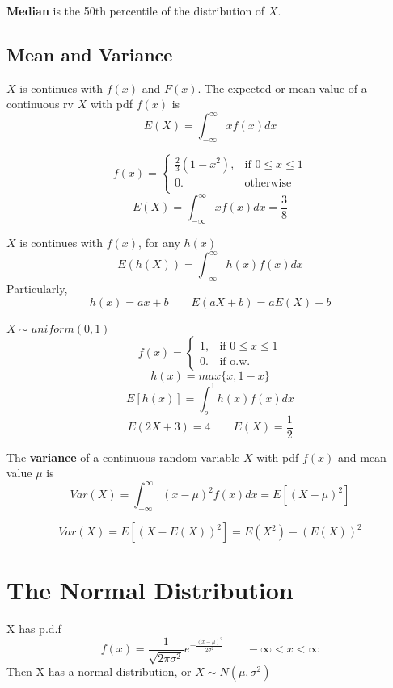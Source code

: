 \textbf{Median} is the 50th percentile of the distribution of $X$.
\subsection{Mean and Variance}
\begin{defn}
$X$ is continues with $f(x)$ and $F(x)$. The expected or mean value of a continuous rv $X$ with pdf $f(x)$ is
\[E(X)=\int_{-\infty}^{\infty}xf(x)dx \]
\end{defn}

\begin{exmp}
\[f(x)=\begin{cases}
\frac{2}{3}(1-x^2), &\text{if } 0\leq x\leq 1\\
0.		&\text{otherwise}\\
\end{cases}\]
\[E(X)=\int_{-\infty}^{\infty}xf(x)dx=\frac{3}{8} \]
\end{exmp}

\begin{prop}
$X$ is continues with $f(x)$, for any $h(x)$
\[E(h(X))=\int_{-\infty}^{\infty}h(x)f(x)dx\]
Particularly,
\[h(x)=ax+b \qquad E(aX+b)=aE(X)+b\]
\end{prop}

\begin{exmp}
$X \sim uniform(0,1)$
\[f(x)=\begin{cases}
1, &\text{if } 0 \leq x\leq 1\\
0. & \text{if o.w.}
\end{cases}\]
\[h(x)=max\{x,1-x\}\]
\[E[h(x)]=\int_o^1 h(x)f(x)dx\]
\[E(2X+3)=4 \qquad E(X)=\frac{1}{2}\]
\end{exmp}


\begin{defn}
The \textbf{variance} of a continuous random variable $X$ with pdf $f(x)$ and mean value $\mu$ is
\[Var(X)=\int_{-\infty}^{\infty} (x-\mu)^2f(x)dx=E[(X-\mu)^2]\]
\end{defn}

\begin{prop}
\[Var(X)=E[(X-E(X))^2]=E(X^2)-(E(X))^2\]
\end{prop}

\section{The Normal Distribution}
X has p.d.f 
\[f(x)=\frac{1}{\sqrt{2 \pi \sigma^2}} e^{-\frac{(x-\mu)^2}{2 \sigma^2}}   \qquad -\infty< x< \infty \]
Then X has a normal distribution, or $X \sim N(\mu,\sigma^2)$


